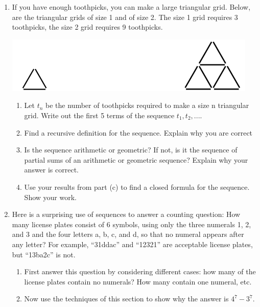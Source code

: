 \documentclass[11pt,a4paper]{article}
\newcommand\setItemNumber[1]{\setcounter{enumi}{\numexpr#1-1\relax}}
\begin{document}
\begin{enumerate}
            \setItemNumber{13}
            \item If you have enough toothpicks, you can make a large triangular grid. Below, are the triangular grids of size 1 and of size 2. The size 1 grid requires 3 toothpicks, the size 2 grid requires 9 toothpicks.

            \begin{center}
            \includegraphics[width=.5\textwidth]{hw6_graphic2}
            \end{center}

                \begin{enumerate}
                    \item Let $t_n$ be the number of toothpicks required to make a size n triangular grid. Write out the first 5 terms of the sequence $t_1, t_2, ...$.
                    \item Find a recursive definition for the sequence. Explain why you are correct
                    \item Is the sequence arithmetic or geometric? If not, is it the sequence of partial sums of an arithmetic or geometric sequence? Explain why your answer is correct.
                    \item Use your results from part (c) to find a closed formula for the sequence. Show your work.
                \end{enumerate}

            \setItemNumber{15}
            \item Here is a surprising use of sequences to answer a counting question: How many license plates consist of 6 symbols, using only the three numerals 1, 2, and 3 and the four letters a, b, c, and d, so that no numeral appears after any letter? For example, “31ddac” and “12321” are acceptable license plates, but “13ba2c” is not.
                \begin{enumerate}
                    \item First answer this question by considering different cases: how many of the license plates contain no numerals? How many contain one numeral, etc.
                    \item Now use the techniques of this section to show why the answer is $4^7 - 3^7$.

                \end{enumerate}

        \end{enumerate}
	
	
		
\end{document}
